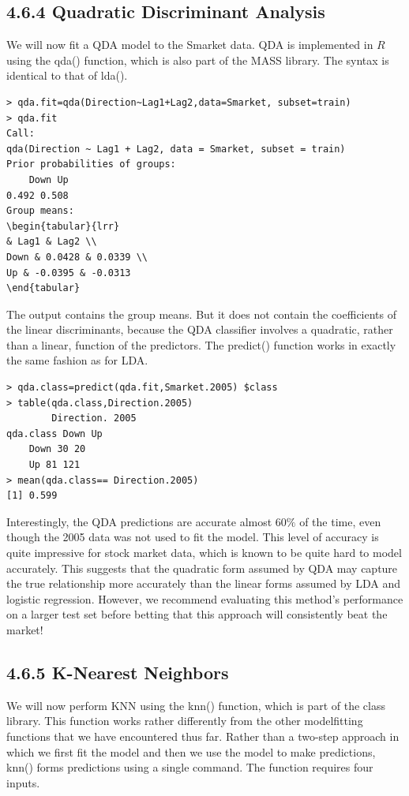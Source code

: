 \documentclass[10pt]{article}
\begin{document}
\subsection*{4.6.4 Quadratic Discriminant Analysis}
We will now fit a QDA model to the Smarket data. QDA is implemented in $R$ using the qda() function, which is also part of the MASS library. The syntax is identical to that of lda().

\begin{verbatim}
> qda.fit=qda(Direction~Lag1+Lag2,data=Smarket, subset=train)
> qda.fit
Call:
qda(Direction ~ Lag1 + Lag2, data = Smarket, subset = train)
Prior probabilities of groups:
    Down Up
0.492 0.508
Group means:
\begin{tabular}{lrr} 
& Lag1 & Lag2 \\
Down & 0.0428 & 0.0339 \\
Up & -0.0395 & -0.0313
\end{tabular}
\end{verbatim}

The output contains the group means. But it does not contain the coefficients of the linear discriminants, because the QDA classifier involves a quadratic, rather than a linear, function of the predictors. The predict() function works in exactly the same fashion as for LDA.

\begin{verbatim}
> qda.class=predict(qda.fit,Smarket.2005) $class
> table(qda.class,Direction.2005)
        Direction. 2005
qda.class Down Up
    Down 30 20
    Up 81 121
> mean(qda.class== Direction.2005)
[1] 0.599
\end{verbatim}

Interestingly, the QDA predictions are accurate almost $60 \%$ of the time, even though the 2005 data was not used to fit the model. This level of accuracy is quite impressive for stock market data, which is known to be quite hard to model accurately. This suggests that the quadratic form assumed by QDA may capture the true relationship more accurately than the linear forms assumed by LDA and logistic regression. However, we recommend evaluating this method's performance on a larger test set before betting that this approach will consistently beat the market!

\subsection*{4.6.5 K-Nearest Neighbors}
We will now perform KNN using the knn() function, which is part of the class library. This function works rather differently from the other modelfitting functions that we have encountered thus far. Rather than a two-step approach in which we first fit the model and then we use the model to make predictions, knn() forms predictions using a single command. The function requires four inputs.
\end{document}
